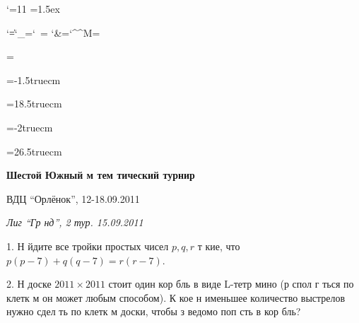 ﻿\nopagenumbers 

\catcode`\@=11
\newdimen\cellsize
\newdimen\lwidth
\cellsize=1.5ex
\bgroup

{\catcode`\|=\active \catcode`\_=\active \catcode`\ =\active%
\catcode`\&=\active\catcode`\^^M=\active%
\gdef\linedefs{\let|\vertline\let_\horline\let \nolines\let&\phantomvertline
\let^^M\nextrow}}

\gdef\lines#1{\count@\z@\dimen0=\cellsize\advance\dimen0 .4pt
  \def\vertline{\count@\@ne\leavevmode\rlap{\vrule height \cellsize}}
  \def\phantomvertline{\count@\@ne\leavevmode\rlap{\phantom{\vrule height \cellsize}}}
  \def\horline{\count@\z@\leavevmode
    \hbox to\cellsize{\vrule height.4pt width\dimen0\hss}}
  \def\nolines{\relax\ifodd\count@\leavevmode\kern\cellsize\count@\z@
    \else\count@\@ne\fi\relax}
  \def\nextrow{\par\count@\z@}
  \lwidth\cellsize
  \multiply\lwidth by #1
  \catcode`\|=\active \catcode`\_=\active \catcode`\&=\active
  \catcode`\^^M=\active \catcode`\ =\active
  \hsize\lwidth\advance\hsize.4pt\parindent\z@\offinterlineskip\linedefs}

\egroup

\magnification=

\hoffset=-1.5truecm

\hsize=18.5truecm

\voffset=-2truecm

\vsize=26.5truecm





\def\geq{\geqslant}

\def\leq{\leqslant}
\def\Q{\Bbb Q}

\centerline{\bf Шестой Южный м тем тический турнир} 

\smallskip

\centerline{ВДЦ ``Орлёнок'', 12-18.09.2011 }

\smallskip

\centerline{\it Лиг  ``Гр нд'', 2 тур. 15.09.2011 }

\medskip

1. Н йдите все тройки простых чисел $p, q, r$ т кие, что
$p(p-7)+q(q-7)=r(r-7)$. 

2. Н  доске $2011 \times 2011$ стоит один кор бль в виде L-тетр мино (р спол г ться
по клетк м он может любым способом). К кое н именьшее количество выстрелов
нужно сдел ть по клетк м доски, чтобы з ведомо поп сть в кор бль?

